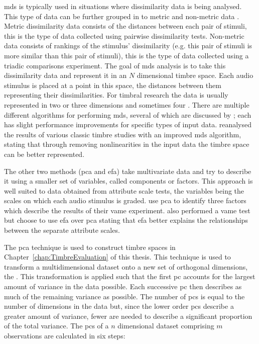 		\acrshort{mds} is typically used in situations where dissimilarity data is being analysed. This type of
		data can be further grouped in to metric and non-metric data \citep{hair2013multivariate}. Metric
		dissimilarity data consists of the distances between each pair of stimuli, this is the type of data
		collected using pairwise dissimilarity tests. Non-metric data consists of rankings of the stimulus'
		dissimilarity (e.g. this pair of stimuli is more similar than this pair of stimuli), this is the type of
		data collected using a triadic comparisons experiment. The goal of \acrshort{mds} analysis is to take this
		dissimilarity data and represent it in an $N$ dimensional timbre space. Each audio stimulus is placed at a
		point in this space, the distances between them representing their dissimilarities. For timbral research
		the data is usually represented in two \citep{giragama2003relating} or three \citep{grey1978perceptual}
		dimensions and sometimes four \citep{bernays2011verbal}. There are multiple different algorithms for
		performing \acrshort{mds}, several of which are discussed by \citet{mcadams1999perspectives}; each has
		slight performance improvements for specific types of input data. \citet{burgoyne2008a} reanalysed the
		results of various classic timbre studies with an improved \acrshort{mds} algorithm, stating that through
		removing nonlinearities in the input data the timbre space can be better represented.

		The other two methods (\acrshort{pca} and \acrshort{efa}) take multivariate data and try to describe it
		using a smaller set of variables, called components or factors. This approach is well suited to data
		obtained from attribute scale tests, the variables being the scales on which each audio stimulus is graded.
		\citet{kendall1993verbal1} use \acrshort{pca} to identify three factors which describe the results of their
		\acrshort{vame} experiment. \citet{zacharakis2012analysis} also performed a \acrshort{vame} test but
		choose to use \acrshort{efa} over \acrshort{pca} stating that \acrshort{efa} better explains the
		relationships between the separate attribute scales.

		The \acrshort{pca} technique is used to construct timbre spaces in Chapter~\ref{chap:TimbreEvaluation} of
		this thesis. This technique is used to transform a multidimensional dataset onto a new set of orthogonal
		dimensions, the . This transformation is applied such that the first \acrshort{pc} accounts
		for the largest amount of variance in the data possible. Each successive \acrshort{pc} then describes as
		much of the remaining variance as possible. The number of \acrshort{pc}s is equal to the number of
		dimensions in the data but, since the lower order \acrshort{pc}s describe a greater amount of variance,
		fewer are needed to describe a significant proportion of the total variance. The \acrshort{pc}s
		of a $n$ dimensional dataset comprising $m$ observations are calculated in six steps:

